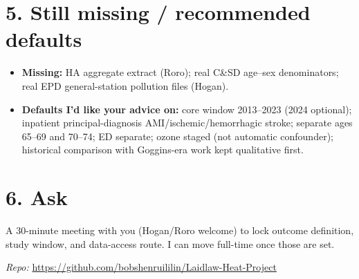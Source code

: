 \documentclass[11pt]{article}
\begin{document}
\section*{5. Still missing / recommended defaults}
\begin{itemize}
  \item \textbf{Missing:} HA aggregate extract (Roro); real C\&SD age--sex denominators; real EPD general-station pollution files (Hogan).
  \item \textbf{Defaults I'd like your advice on:} core window 2013--2023 (2024 optional); inpatient principal-diagnosis AMI/ischemic/hemorrhagic stroke; separate ages 65--69 and 70--74; ED separate; ozone staged (not automatic confounder); historical comparison with Goggins-era work kept qualitative first.
\end{itemize}

\section*{6. Ask}
A 30-minute meeting with you (Hogan/Roro welcome) to lock outcome definition, study window, and data-access route. I can move full-time once those are set.

\vspace{0.5em}
\noindent\textit{Repo:} \url{https://github.com/bobshenruililin/Laidlaw-Heat-Project}
\end{document}
